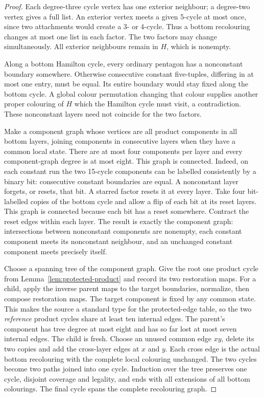 \documentclass[11pt]{article}
\theoremstyle{remark}
\numberwithin{equation}{section}
\numberwithin{table}{section}
\begin{document}
\begin{proof}
Each degree-three cycle vertex has one exterior neighbour; a
degree-two vertex gives a full list. An exterior vertex meets a
given 5-cycle at most once, since two attachments would create a
3- or 4-cycle. Thus a bottom recolouring changes at most one list
in each factor. The two factors may change simultaneously.
All exterior neighbours remain in $H$, which is nonempty.

Along a bottom Hamilton cycle, every ordinary pentagon has a
nonconstant boundary somewhere. Otherwise consecutive constant
five-tuples, differing in at most one entry, must be equal.
Its entire boundary would stay fixed along the bottom cycle.
A global colour permutation changing that colour supplies another
proper colouring of $H$ which the Hamilton cycle must visit,
a contradiction. These nonconstant layers need not coincide
for the two factors.

Make a component graph whose vertices are all product components
in all bottom layers, joining components in consecutive layers
when they have a common local state. There are at most four components
per layer and every component-graph degree is at most eight.
This graph is connected. Indeed, on each constant run the two
15-cycle components can be labelled consistently by a binary bit:
consecutive constant boundaries are equal. A nonconstant layer
forgets, or resets, that bit. A starred factor resets it at every layer.
Take four bit-labelled copies of the bottom cycle and allow a flip of
each bit at its reset layers. This graph is connected because each
bit has a reset somewhere. Contract the reset edges within each
layer. The result is exactly the component graph: intersections
between nonconstant components are nonempty, each constant component
meets its nonconstant neighbour, and an unchanged constant component
meets precisely itself.

Choose a spanning tree of the component graph. Give the root one
product cycle from Lemma~\ref{lem:protected-product} and record its
two restoration maps. For a child, apply the inverse parent maps
to the target boundaries, normalize, then compose restoration maps.
The target component is fixed by any common state. This makes the
source a standard type for the protected-edge table, so the
two \emph{reference} product cycles share at least ten internal edges.
The parent's component has tree degree at most eight and has so far
lost at most seven internal edges. The child is fresh.
Choose an unused common edge $xy$, delete its two copies and add
the cross-layer edges at $x$ and $y$. Each cross edge is the actual
bottom recolouring with the complete local colouring unchanged.
The two cycles become two paths joined into one cycle.
Induction over the tree preserves one cycle, disjoint coverage and
legality, and ends with all extensions of all bottom colourings.
The final cycle spans the complete recolouring graph.
\end{proof}
\end{document}
